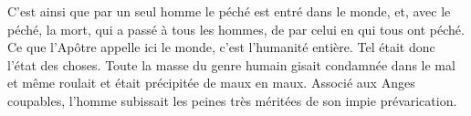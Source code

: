 C’est ainsi que par un seul homme le péché est entré dans le monde,
	et, avec le péché, la mort, qui a passé à tous les hommes,
	de par celui en qui tous ont péché.
Ce que l’Apôtre appelle ici le monde, c’est l’humanité entière.
Tel était donc l’état des choses.
	Toute la masse du genre humain gisait condamnée dans le mal
	et même roulait et était précipitée de maux en maux.
Associé aux Anges coupables,
	l’homme subissait les peines très méritées de son impie prévarication.

